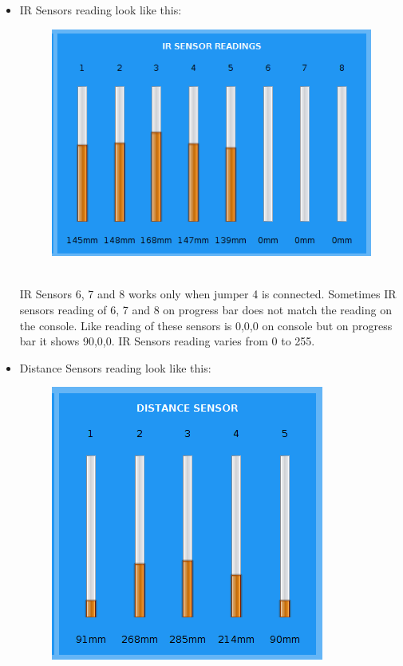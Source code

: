 \documentclass[a4paper,12pt,oneside]{book}
\begin{document}
\begin{enumerate}
\begin{itemize}
\begin{itemize}
				\item IR Sensors reading look like this: \\ 
				\begin{figure}[h]
					\begin{center}
						\includegraphics[scale=0.75]{irsensor.png}
					\end{center} 
				\end{figure} \\
				IR Sensors 6, 7 and 8 works only when jumper 4 is connected. Sometimes IR sensors reading of 6, 7 and 8 on progress bar does not match the reading on the console. Like reading of these sensors is 0,0,0 on console but on progress bar it shows 90,0,0. IR Sensors reading varies from 0 to 255.
				\newpage
				\item Distance Sensors reading look like this: \\
				\begin{figure}[h]
					\begin{center}
						\includegraphics[scale=0.75]{distance_sensor.png}

\end{center}
\end{figure}
\end{itemize}
\end{itemize}
\end{enumerate}
\end{document}
